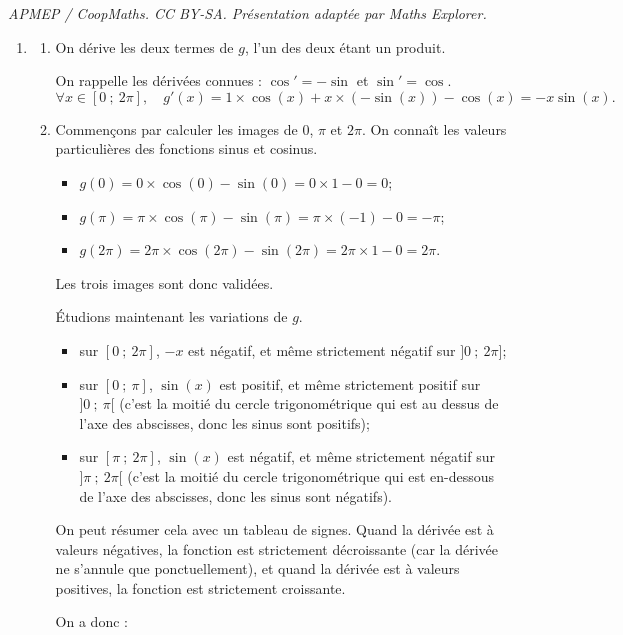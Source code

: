 \documentclass[10pt]{article}
\begin{document}
\noindent\textit{APMEP / CoopMaths. CC BY-SA. Présentation adaptée par Maths Explorer.}\par\medskip
\begin{enumerate}
\item \begin{enumerate}
\item On dérive les deux termes de $g$, l'un des deux étant un produit.

On rappelle les dérivées connues : $\cos'=-\sin$ et $\sin'=\cos$.
\[
\forall x\in [0~;~2\pi],\quad g'(x)=1\times \cos(x)+x\times \left(-\sin(x)\right)-\cos(x)=-x\sin(x).
\]

\item Commençons par calculer les images de 0, $\pi$ et $2\pi$. On connaît les valeurs particulières des fonctions sinus et cosinus.
\begin{itemize}
\item $g(0)=0\times \cos(0)-\sin(0)=0\times 1-0=0$;
\item $g(\pi)=\pi\times \cos(\pi)-\sin(\pi)=\pi\times(-1)-0=-\pi$;
\item $g(2\pi)=2\pi\times \cos(2\pi)-\sin(2\pi)=2\pi\times 1-0=2\pi$.
\end{itemize}
Les trois images sont donc validées.

Étudions maintenant les variations de $g$.
\begin{itemize}
\item sur $[0~;~2\pi]$, $-x$ est négatif, et même strictement négatif sur $]0~;~2\pi]$;
\item sur $[0~;~\pi]$, $\sin(x)$ est positif, et même strictement positif sur $]0~;~\pi[$ (c'est la moitié du cercle trigonométrique qui est au dessus de l'axe des abscisses, donc les sinus sont positifs);
\item sur $[\pi~;~2\pi]$, $\sin(x)$ est négatif, et même strictement négatif sur $]\pi~;~2\pi[$ (c'est la moitié du cercle trigonométrique qui est en-dessous de l'axe des abscisses, donc les sinus sont négatifs).
\end{itemize}
On peut résumer cela avec un tableau de signes. Quand la dérivée est à valeurs négatives, la fonction est strictement décroissante (car la dérivée ne s'annule que ponctuellement), et quand la dérivée est à valeurs positives, la fonction est strictement croissante.

On a donc :

\begin{center}
\end{center}
\end{enumerate}
\end{enumerate}
\end{document}
